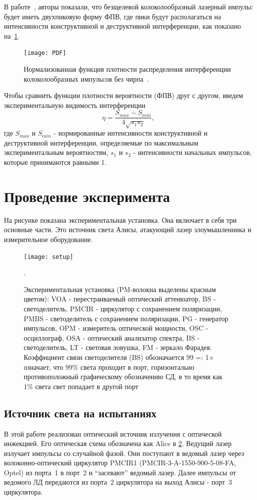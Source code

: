 В работе~\cite{shakhovoy2021}, авторы показали, что безщелевой колоколообразный лазерный импульс будет иметь двухпиковую форму ФПВ, где пики будут располагаться на интенсивности конструктивной и деструктивной интерференции, как показано на~\cref{fig:PDF}.
\begin{figure}
\texttt{[image: PDF]}
\caption{Нормализованная функция плотности распределения интерференции колоколообразных импульсов без чирпа~\cite{shakhovoy2021}.}
\label{fig:PDF}
\end{figure}
Чтобы сравнить функции плотности вероятности (ФПВ) друг с другом, введем экспериментальную видимость интерференции
\begin{equation}
\label{eq:visibility}
	\eta = {\frac{S_{max} - S_{min}}{4\sqrt{s_1 s_2}}},
\end{equation}
где $S_{max}$ и $S_{min}$ - нормированные интенсивности конструктивной и деструктивной интерференции, определяемые по максимальным экспериментальным вероятностям, $s_1$ и $s_2$ - интенсивности начальных импульсов, которые принимаются равными 1.
\section{Проведение эксперимента}
\label{sec:experiment} 

На рисунке  показана экспериментальная установка. Она включает в себя три основные части. Это источник света Алисы, атакующий лазер злоумышленника и измерительное оборудование.
\begin{figure}
\texttt{[image: setup]}
\caption{Экспериментальная установка (PM-волокна выделены красным цветом): VOA - перестраиваемый оптический аттенюатор, BS - светоделитель, PMCIR - циркулятор с сохранением поляризации, PMBS - светоделитель с сохранением поляризации, PG - генератор импульсов, OPM - измеритель оптической мощности, OSC - осциллограф, OSA - оптический анализатор спектра, BS - светоделитель, LT - световая ловушка, FM - зеркало Фарадея. Коэффициент связи светоделителя (BS) обозначается 99 =: 1× означает, что $99\%$ света проходит в порт, горизонтально противоположный графическому обозначению СД, в то время как $1\%$ света
свет попадает в другой порт}.
\label{fig:setup}
\end{figure}
\subsection{Источник света на испытаниях}

В этой работе реализован оптический источник излучения с оптической инжекцией. Его оптическая схема обозначена как Alice в \cref{fig:setup}. Ведущий лазер излучает импульсы со случайной фазой. Они поступают в ведомый лазер через волоконно-оптический циркулятор PMCIR1 (PMCIR-3-A-1550-900-5-08-FA, Optel) из порта~1 в порт~2 и ``засевают'' ведомый лазер. Далее импульсы от ведомого ЛД передаются из порта~2 циркулятора на выход Алисы - порт~3 циркулятора.

